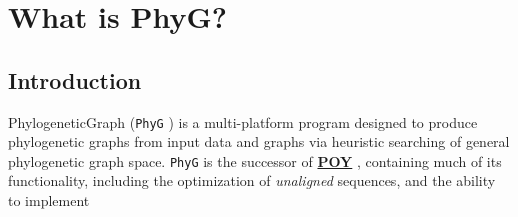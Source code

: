 \documentclass[11pt]{book}
\newcommand{\phyg}{\texttt{PhyG} }
\begin{document}
	\tableofcontents

\chapter{What is PhyG?}

	\section{Introduction}
	PhylogeneticGraph (\phyg) is a multi-platform program designed to produce phylogenetic 
	graphs from input data and graphs via heuristic searching of general phylogenetic graph 
	space. \texttt{PhyG} is the successor of \href{https://github.com/wardwheeler/POY5}{\textbf{POY}}
	\citep{POY2,POY3,POY4,Varonetal2010,POY5, Wheeleretal2015}, containing much of its 
	functionality, including the optimization of \textit{unaligned} sequences, and the ability to implement 
\end{document}
